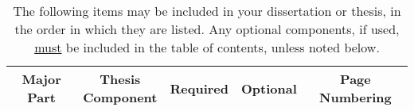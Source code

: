 \begin{table}
	\caption[%
        Required and Optional Thesis Components (NOTE: If you have a multi-lined table label/title,
        then the 2\textsuperscript{nd} and all additional lines should align with the first line, just like this one;
        also, be sure that no words display to the far right hand side where the page numbers for
        your tables display, just as shown in this example.)
    ]{The following items may be included in your dissertation or thesis, in the order in which they are listed.
    Any optional components, if used, \underline{must} be included in the table of contents, unless noted below.}
  \label{tab:include}
  \centering
  \DoubleSpacing

  \newcommand{\mycheckmark}{\ding{52}}

  \footnotesize
  \begin{threeparttable}[b]
  \begin{tabular}{@{}ccccc@{}}
  \toprule
    \textbf{Major Part} &
    \makecell[b]{\textbf{Thesis} \\ \textbf{Component}} &
    \textbf{Required} &
    \textbf{Optional} &
    \textbf{Page Numbering} \\
  \midrule


\end{tabular}
\end{threeparttable}
\end{table}
